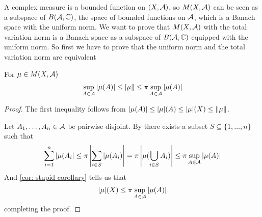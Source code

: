 A complex measure is a bounded function on $(X, \mathcal{A})$, so $M(X, \mathcal{A})$ can be seen as a subspace of $B(\mathcal{A}, \mathbb{C})$, the space of bounded functions on $\mathcal{A}$, which is a Banach space with the uniform norm. We want to prove that $M(X, \mathcal{A})$ with the total variation norm is a Banach space as a subspace of $B(\mathcal{A}, \mathbb{C})$ equipped with the uniform norm. So first we have to prove that the uniform norm and the total variation norm are equivalent

\begin{lemma}
For $\mu \in M(X, \mathcal{A})$
\begin{align*}
	\sup_{A\in \mathcal{A}} |\mu(A)| \le \vert \mu \Vert \le \pi \sup_{A\in \mathcal{A}} |\mu(A)|
\end{align*}
\end{lemma}
\begin{proof}
The first inequality follows from $|\mu(A)| \le |\mu|(A)\le |\mu|(X) \le \Vert{\mu}\Vert$.

Let $A_{1},\dots,A_{n}\in \mathcal{A}$ be pairwise disjoint. By  there exists a subset $S\subseteq \{1,\dots, n\}$ such that
\begin{align*}
	\sum_{i=1}^{n}|\mu(A_{i}| \le \pi \left| \sum_{i\in S}|\mu(A_{i}) \right| = \pi \left| \mu(\bigcup_{i\in S} A_{i}) \right| \le \pi \sup_{A\in \mathcal{A}} |\mu(A)|
\end{align*}
And \cref{cor: stupid corollary} tells us that
\begin{align*}
	|\mu|(X)\le \pi \sup_{A\in \mathcal{A}} |\mu(A)|
\end{align*}
completing the proof.
\end{proof}



